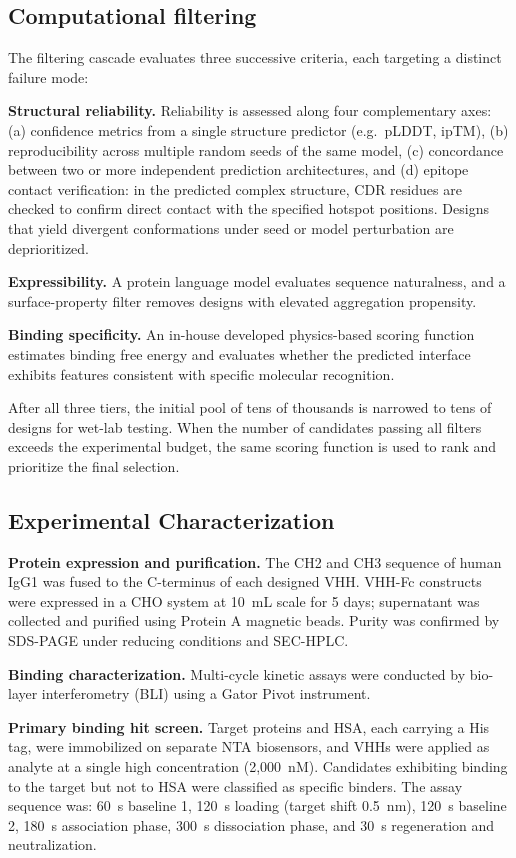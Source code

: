 \documentclass[11pt]{article}
\begin{document}
\subsection{Computational filtering}
The filtering cascade evaluates three successive criteria, each targeting a distinct failure mode:

\textbf{Structural reliability.} Reliability is assessed along four complementary axes: (a) confidence metrics from
a single structure predictor (e.g.\ pLDDT, ipTM), (b) reproducibility across multiple random seeds of the same
model, (c) concordance between two or more independent prediction architectures, and (d) epitope contact
verification: in the predicted complex structure, CDR residues are checked to confirm direct contact with the
specified hotspot positions. Designs that yield divergent conformations under seed or model perturbation
are deprioritized.

\textbf{Expressibility.} A protein language model evaluates sequence naturalness, and a surface-property filter
removes designs with elevated aggregation propensity.

\textbf{Binding specificity.} An in-house developed physics-based scoring function estimates binding free energy
and evaluates whether the predicted interface exhibits features consistent with specific molecular recognition.

After all three tiers, the initial pool of tens of thousands is narrowed to tens of designs for wet-lab testing.
When the number of candidates passing all filters exceeds the experimental budget, the same scoring function
is used to rank and prioritize the final selection.

\subsection{Experimental Characterization}
\textbf{Protein expression and purification.} The CH2 and CH3 sequence of human IgG1 was fused to the
C-terminus of each designed VHH. VHH-Fc constructs were expressed in a CHO system at 10~mL scale for
5 days; supernatant was collected and purified using Protein A magnetic beads. Purity was confirmed by
SDS-PAGE under reducing conditions and SEC-HPLC.

\textbf{Binding characterization.} Multi-cycle kinetic assays were conducted by bio-layer interferometry (BLI)
using a Gator Pivot instrument.

\textbf{Primary binding hit screen.} Target proteins and HSA, each carrying a His tag, were immobilized on
separate NTA biosensors, and VHHs were applied as analyte at a single high concentration (2,000~nM).
Candidates exhibiting binding to the target but not to HSA were classified as specific binders. The assay
sequence was: 60~s baseline 1, 120~s loading (target shift 0.5~nm), 120~s baseline 2, 180~s association phase, 300~s
dissociation phase, and 30~s regeneration and neutralization.
\end{document}
